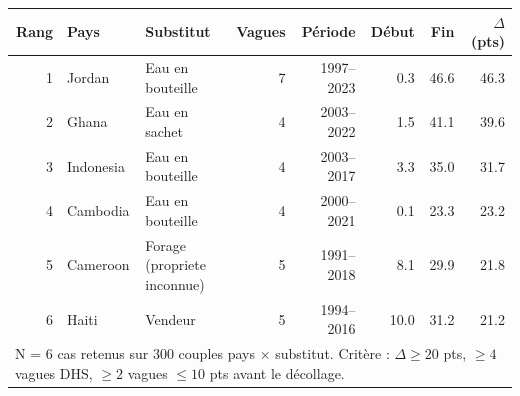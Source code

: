 \begin{tabular}{rllrrrrr}
\toprule
Rang & Pays & Substitut & Vagues & P\'eriode & D\'ebut & Fin & $\Delta$ (pts) \\
\midrule
1 & Jordan & Eau en bouteille & 7 & 1997--2023 & 0.3 & 46.6 & 46.3 \\
2 & Ghana & Eau en sachet & 4 & 2003--2022 & 1.5 & 41.1 & 39.6 \\
3 & Indonesia & Eau en bouteille & 4 & 2003--2017 & 3.3 & 35.0 & 31.7 \\
4 & Cambodia & Eau en bouteille & 4 & 2000--2021 & 0.1 & 23.3 & 23.2 \\
5 & Cameroon & Forage (propriete inconnue) & 5 & 1991--2018 & 8.1 & 29.9 & 21.8 \\
6 & Haiti & Vendeur & 5 & 1994--2016 & 10.0 & 31.2 & 21.2 \\
\bottomrule
\multicolumn{8}{l}{\footnotesize N = 6 cas retenus sur 300 couples pays $\times$ substitut. Crit\`ere : $\Delta \geq 20$ pts, $\geq 4$ vagues DHS, $\geq 2$ vagues $\leq 10$ pts avant le d\'ecollage.} \\
\end{tabular}
